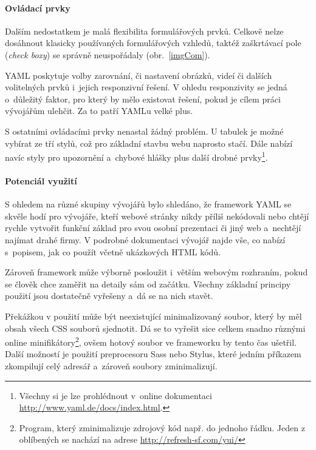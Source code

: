 \documentclass[thesis=B,czech]{FITthesis}[2012/06/26]
\begin{document}
\paragraph{Ovládací prvky}

Dalším nedostatkem je malá flexibilita formulářových prvků. Celkově nelze dosáhnout klasicky používaných formulářových vzhledů, taktéž zaškrtávací pole (\textit{check boxy}) se správně neuspořádaly (obr.~\ref{imgCom}). 

\gls{YAML} poskytuje volby zarovnání, či nastavení obrázků, videí či dalších volitelných prvků i~jejich responzivní řešení. V ohledu responzivity se jedná o~důležitý faktor, pro který by mělo existovat řešení, pokud je cílem práci vývojářům ulehčit. Za to patří \gls{YAML}u velké plus.


S ostatními ovládacími prvky nenastal žádný problém. U tabulek  je možné vybírat ze tří stylů, což pro základní stavbu webu naprosto stačí. Dále nabízí navíc styly pro upozornění a~chybové hlášky plus další drobné prvky\footnote{Všechny si je lze prohlédnout v~online dokumentaci \url{http://www.yaml.de/docs/index.html}.}. 

\paragraph{Potenciál využití}

S ohledem na různé skupiny vývojářů bylo shledáno, že framework \gls{YAML} se skvěle hodí pro vývojáře, kteří webové stránky nikdy příliš nekódovali nebo chtějí rychle vytvořit funkční základ pro svou osobní prezentaci či jiný web a~nechtějí najímat drahé firmy. V podrobné dokumentaci vývojář najde vše, co nabízí s~popisem, jak co použít včetně ukázkových \gls{HTML} kódů.

Zároveň framework může výborně posloužit i~větším webovým rozhraním, pokud se člověk chce zaměřit na detaily sám od začátku. Všechny základní principy použití jsou dostatečně vyřešeny a~dá se na nich stavět. 

Překážkou v použití může být neexistující minimalizovaný soubor, který by měl obsah  všech \gls{CSS} souborů sjednotit. Dá se to vyřešit sice celkem snadno různými online minifikátory\footnote{Program, který zminimalizuje zdrojový kód např. do jednoho řádku. Jeden z oblíbených se nachází na adrese \url{http://refresh-sf.com/yui/}}, ovšem hotový soubor ve frameworku by tento čas ušetřil. Další možností je použití preprocesoru \gls{Sass} nebo Stylus, které jedním příkazem zkompilují celý adresář a~zároveň soubory zminimalizují.
\end{document}

